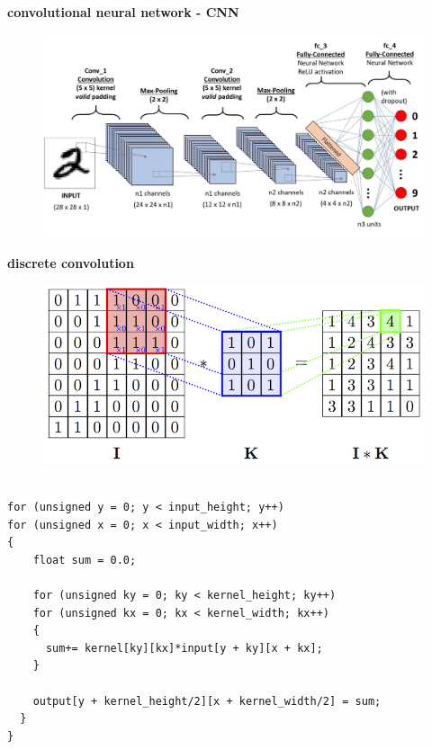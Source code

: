 \documentclass[xcolor=dvipsnames]{beamer}
\begin{document}
\begin{frame}{\bf convolutional neural network - CNN}

  \begin{figure}
    \includegraphics[scale=0.2]{../images/cnn.jpg}
  \end{figure}

\end{frame}




\begin{frame}[fragile]
{\bf discrete convolution}

\begin{figure}
  \includegraphics[scale=0.2]{../images/convolution_2d.png}
\end{figure}


\begin{lstlisting}

for (unsigned y = 0; y < input_height; y++)
for (unsigned x = 0; x < input_width; x++)
{
    float sum = 0.0;

    for (unsigned ky = 0; ky < kernel_height; ky++)
    for (unsigned kx = 0; kx < kernel_width; kx++)
    {
      sum+= kernel[ky][kx]*input[y + ky][x + kx];
    }

    output[y + kernel_height/2][x + kernel_width/2] = sum;
  }
}
\end{lstlisting}
\end{frame}
\end{document}
